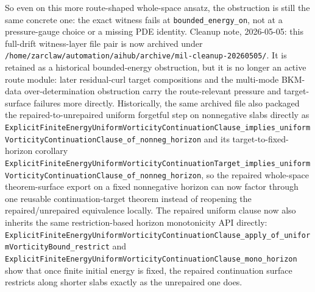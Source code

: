 \documentclass[11pt]{article}
\begin{document}
So even on this more route-shaped whole-space ansatz, the obstruction is still
the same concrete one: the exact witness fails at
\texttt{bounded\_energy\_on}, not at a pressure-gauge choice or a missing PDE
identity.
Cleanup note, 2026-05-05: this full-drift witness-layer file pair is now
archived under
\texttt{/home/zarclaw/automation/aihub/archive/mil-cleanup-20260505/}.  It is
retained as a historical bounded-energy obstruction, but it is no longer an
active route module: later residual-curl target compositions and the multi-mode
BKM-data over-determination obstruction carry the route-relevant pressure and
target-surface failures more directly.
Historically, the same archived file also packaged the repaired-to-unrepaired
uniform forgetful step on nonnegative slabs directly as
\texttt{ExplicitFiniteEnergyUniformVorticityContinuationClause\_implies\_uniformVorticityContinuationClause\_of\_nonneg\_horizon}
and its target-to-fixed-horizon corollary
\texttt{ExplicitFiniteEnergyUniformVorticityContinuationTarget\_implies\_uniformVorticityContinuationClause\_of\_nonneg\_horizon},
so the repaired whole-space theorem-surface export on a fixed nonnegative
horizon can now factor through one reusable continuation-target theorem instead
of reopening the repaired/unrepaired equivalence locally.
The repaired uniform clause now also inherits the same restriction-based
horizon monotonicity API directly:
\texttt{ExplicitFiniteEnergyUniformVorticityContinuationClause\_apply\_of\_uniformVorticityBound\_restrict}
and
\texttt{ExplicitFiniteEnergyUniformVorticityContinuationClause\_mono\_horizon}
show that once finite initial energy is fixed, the repaired continuation
surface restricts along shorter slabs exactly as the unrepaired one does.
\end{document}
